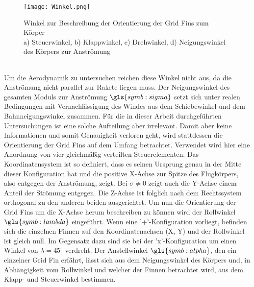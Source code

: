 \begin{figure}[h]
	\centering
	\texttt{[image: Winkel.png]}
	\caption{Winkel zur Beschreibung der Orientierung der Grid Fins zum Körper\\a) Steuerwinkel, b) Klappwinkel, c) Drehwinkel, d) Neigungswinkel des Körpers zur Anströmung}
	\label{abb_winkel}
\end{figure}\\
Um die Aerodynamik zu untersuchen reichen diese Winkel nicht aus, da die Anströmung nicht parallel zur Rakete liegen muss. Der Neigungswinkel des gesamten Moduls zur Anströmung $\gls{symb:sigma}$ setzt sich unter realen Bedingungen mit Vernachlässigung des Windes aus dem Schiebewinkel und dem Bahnneigungswinkel zusammen. Für die in dieser Arbeit durchgeführten Untersuchungen ist eine solche Aufteilung aber irrelevant. Damit aber keine Informationen und somit Genauigkeit verloren geht, wird stattdessen die Orientierung der Grid Fins auf dem Umfang betrachtet. Verwendet wird hier eine Anordnung von vier gleichmäßig verteilten Steuerelementen. Das Koordinatensystem ist so definiert, dass es seinen Ursprung genau in der Mitte dieser Konfiguration hat und die positive X-Achse zur Spitze des Flugkörpers, also entgegen der Anströmung, zeigt. Bei $\sigma \neq 0$ zeigt auch die Y-Achse einem Anteil der Strömung entgegen. Die Z-Achse ist folglich nach dem Rechtssystem orthogonal zu den anderen beiden ausgerichtet. Um nun die Orientierung der Grid Fins um die X-Achse herum beschreiben zu können wird der Rollwinkel $\gls{symb:lambda}$ eingeführt. Wenn eine '+'-Konfiguration vorliegt, befinden sich die einzelnen Finnen auf den Koordinatenachsen (X, Y) und der Rollwinkel ist gleich null. Im Gegensatz dazu sind sie bei der 'x'-Konfiguration um einen Winkel von $\lambda = 45^\circ$ verdreht. Der Anstellwinkel $\gls{symb:alpha}$, den ein einzelner Grid Fin erfährt, lässt sich aus dem Neigungswinkel des Körpers und, in Abhängigkeit vom Rollwinkel und welcher der Finnen betrachtet wird, aus dem Klapp- und Steuerwinkel bestimmen.



